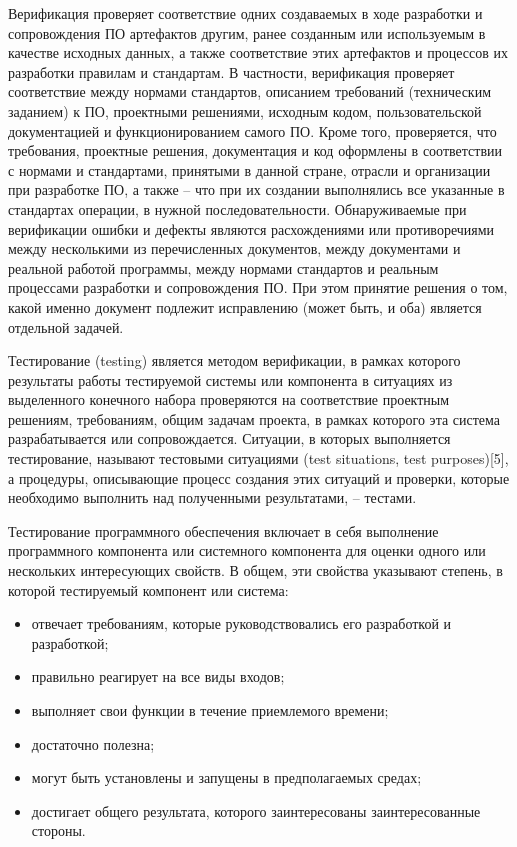 Верификация проверяет соответствие одних создаваемых в ходе разработки и сопровождения ПО артефактов другим, ранее созданным или используемым в качестве исходных данных, а также соответствие этих артефактов и процессов их разработки правилам и стандартам. В частности, верификация проверяет соответствие между нормами стандартов, описанием требований (техническим заданием) к ПО, проектными решениями, исходным кодом, пользовательской документацией и функционированием самого ПО. Кроме того, проверяется, что требования, проектные решения, документация и код оформлены в соответствии с нормами и стандартами, принятыми в данной стране, отрасли и организации при разработке ПО, а также – что при их создании выполнялись все указанные в стандартах операции, в нужной последовательности. Обнаруживаемые при верификации ошибки и дефекты являются расхождениями или противоречиями между несколькими из перечисленных документов, между документами и реальной работой программы, между нормами стандартов и реальным процессами разработки и сопровождения ПО. При этом принятие решения о том, какой именно документ подлежит исправлению (может быть, и оба) является отдельной задачей.

Тестирование (testing) является методом верификации, в рамках которого результаты работы тестируемой системы или компонента в ситуациях из выделенного конечного набора проверяются на соответствие проектным решениям, требованиям, общим задачам проекта, в рамках которого эта система разрабатывается или сопровождается. Ситуации, в которых выполняется тестирование, называют тестовыми ситуациями (test situations, test purposes)[5], а процедуры, описывающие процесс создания этих ситуаций и проверки, которые необходимо выполнить над полученными результатами, – тестами.

Тестирование программного обеспечения включает в себя выполнение программного компонента или системного компонента для оценки одного или нескольких интересующих свойств. В общем, эти свойства указывают степень, в которой тестируемый компонент или система:
\begin{itemize}
	\item отвечает требованиям, которые руководствовались его разработкой и разработкой;
	\item правильно реагирует на все виды входов;
	\item выполняет свои функции в течение приемлемого времени;
	\item достаточно полезна;
	\item могут быть установлены и запущены в предполагаемых средах;
	\item достигает общего результата, которого заинтересованы заинтересованные стороны.
\end{itemize}

